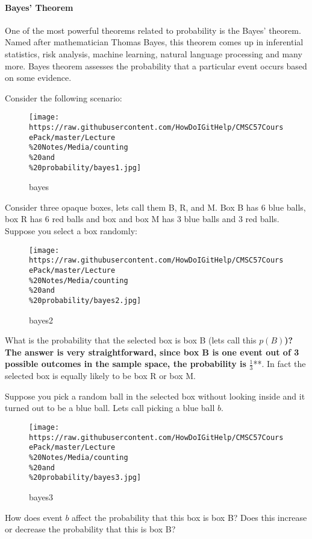 \hypertarget{bayes-theorem}{%
\paragraph{Bayes' Theorem}\label{bayes-theorem}}

One of the most powerful theorems related to probability is the Bayes'
theorem. Named after mathematician Thomas Bayes, this theorem comes up
in inferential statistics, risk analysis, machine learning, natural
language processing and many more. Bayes theorem assesses the
probability that a particular event occurs based on some evidence.

Consider the following scenario:

\begin{figure}
\centering
\texttt{[image: https://raw.githubusercontent.com/HowDoIGitHelp/CMSC57CoursePack/master/Lecture\\\%20Notes/Media/counting\\\%20and\\\%20probability/bayes1.jpg]}
\caption{bayes}
\end{figure}

Consider three opaque boxes, lets call them B, R, and M. Box B has 6
blue balls, box R has 6 red balls and box and box M has 3 blue balls and
3 red balls. Suppose you select a box randomly:

\begin{figure}
\centering
\texttt{[image: https://raw.githubusercontent.com/HowDoIGitHelp/CMSC57CoursePack/master/Lecture\\\%20Notes/Media/counting\\\%20and\\\%20probability/bayes2.jpg]}
\caption{bayes2}
\end{figure}

What is the probability that the selected box is box B (lets call this
\textbf{\(p(B)\))? The answer is very straightforward, since box B is
one event out of 3 possible outcomes in the sample space, the
probability is }\(\frac{1}{3}\)**. In fact the selected box is equally
likely to be box R or box M.

Suppose you pick a random ball in the selected box without looking
inside and it turned out to be a blue ball. Lets call picking a blue
ball \textbf{\(b\)}.

\begin{figure}
\centering
\texttt{[image: https://raw.githubusercontent.com/HowDoIGitHelp/CMSC57CoursePack/master/Lecture\\\%20Notes/Media/counting\\\%20and\\\%20probability/bayes3.jpg]}
\caption{bayes3}
\end{figure}

How does event \textbf{\(b\)} affect the probability that this box is
box B? Does this increase or decrease the probability that this is box
B?

